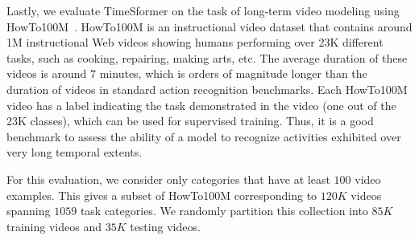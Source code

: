 \documentclass{article}
\begin{document}
Lastly, we evaluate TimeSformer on the task of long-term video modeling using HowTo100M~\cite{miech19howto100m}. HowTo100M is an instructional video dataset that contains around 1M instructional Web videos showing humans performing over 23K different tasks, such as cooking, repairing, making arts, etc. The average duration of these videos is around $7$ minutes, which is orders of magnitude longer than the duration of videos in standard action recognition benchmarks. Each HowTo100M video has a label indicating the task demonstrated in the video (one out of the 23K classes), which can be used for supervised training. Thus, it is a good benchmark to assess the ability of a model to recognize activities exhibited over very long temporal extents.



For this evaluation, we consider only categories that have at least $100$ video examples. This gives a subset of HowTo100M corresponding to $120K$ videos spanning $1059$ task categories. We randomly partition this collection into $85K$ training videos and $35K$ testing videos. 

\end{document}
